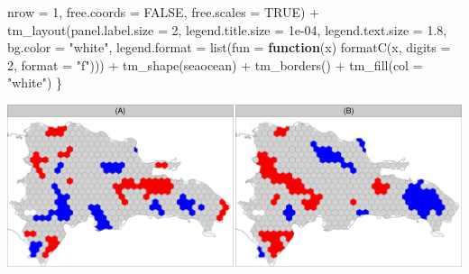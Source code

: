 \documentclass[10pt,landscape,a3paper]{article}
\newenvironment{Shaded}{\begin{snugshade}}{\end{snugshade}}
\newcommand{\AttributeTok}[1]{\textcolor[rgb]{0.77,0.63,0.00}{#1}}
\newcommand{\ConstantTok}[1]{\textcolor[rgb]{0.00,0.00,0.00}{#1}}
\newcommand{\ControlFlowTok}[1]{\textcolor[rgb]{0.13,0.29,0.53}{\textbf{#1}}}
\newcommand{\DecValTok}[1]{\textcolor[rgb]{0.00,0.00,0.81}{#1}}
\newcommand{\FloatTok}[1]{\textcolor[rgb]{0.00,0.00,0.81}{#1}}
\newcommand{\FunctionTok}[1]{\textcolor[rgb]{0.00,0.00,0.00}{#1}}
\newcommand{\NormalTok}[1]{#1}
\newcommand{\SpecialCharTok}[1]{\textcolor[rgb]{0.00,0.00,0.00}{#1}}
\newcommand{\StringTok}[1]{\textcolor[rgb]{0.31,0.60,0.02}{#1}}
\begin{document}
\begin{Shaded}
\begin{Highlighting}[]
        \AttributeTok{nrow =} \DecValTok{1}\NormalTok{, }\AttributeTok{free.coords =} \ConstantTok{FALSE}\NormalTok{, }\AttributeTok{free.scales =} \ConstantTok{TRUE}\NormalTok{) }\SpecialCharTok{+} \FunctionTok{tm\_layout}\NormalTok{(}\AttributeTok{panel.label.size =} \DecValTok{2}\NormalTok{,}
        \AttributeTok{legend.title.size =} \FloatTok{1e{-}04}\NormalTok{, }\AttributeTok{legend.text.size =} \FloatTok{1.8}\NormalTok{, }\AttributeTok{bg.color =} \StringTok{"white"}\NormalTok{, }\AttributeTok{legend.format =} \FunctionTok{list}\NormalTok{(}\AttributeTok{fun =} \ControlFlowTok{function}\NormalTok{(x) }\FunctionTok{formatC}\NormalTok{(x,}
            \AttributeTok{digits =} \DecValTok{2}\NormalTok{, }\AttributeTok{format =} \StringTok{"f"}\NormalTok{))) }\SpecialCharTok{+} \FunctionTok{tm\_shape}\NormalTok{(seaocean) }\SpecialCharTok{+} \FunctionTok{tm\_borders}\NormalTok{() }\SpecialCharTok{+} \FunctionTok{tm\_fill}\NormalTok{(}\AttributeTok{col =} \StringTok{"white"}\NormalTok{)}
\NormalTok{\}}
\end{Highlighting}
\end{Shaded}

\begin{center}\includegraphics{img/modelling/lta-esda-15} \end{center}
\end{document}
